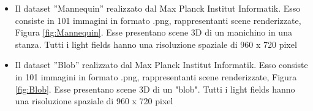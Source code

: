 \begin{itemize}
    \item  Il dataset ”Mannequin”\cite{Mannequin} realizzato dal Max Planck Institut Informatik. Esso consiste in 101 immagini in formato .png, rappresentanti scene renderizzate, Figura \ref{fig:Mannequin}. Esse presentano scene 3D di un manichino in una stanza. Tutti i light fields hanno una risoluzione spaziale di 960 x 720 pixel

    \item  Il dataset ”Blob”\cite{Blob} realizzato dal Max Planck Institut Informatik. Esso consiste in 101 immagini in formato .png, rappresentanti scene renderizzate, Figura \ref{fig:Blob}. Esse presentano scene 3D di un "blob". Tutti i light fields hanno una risoluzione spaziale di 960 x 720 pixel


\end{itemize}


